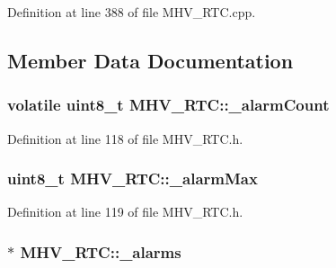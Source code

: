 \-Definition at line 388 of file \-M\-H\-V\-\_\-\-R\-T\-C.\-cpp.



\subsection{\-Member \-Data \-Documentation}
\hypertarget{class_m_h_v___r_t_c_a953a79952c9fa5fde5d1dacbc03d3b46}{
\subsubsection[{\-\_\-alarm\-Count}]{\setlength{\rightskip}{0pt plus 5cm}volatile uint8\-\_\-t {\bf \-M\-H\-V\-\_\-\-R\-T\-C\-::\-\_\-alarm\-Count}}}
\label{class_m_h_v___r_t_c_a953a79952c9fa5fde5d1dacbc03d3b46}


\-Definition at line 118 of file \-M\-H\-V\-\_\-\-R\-T\-C.\-h.

\hypertarget{class_m_h_v___r_t_c_aed7d37466a99362b78dd9ccf1390d35c}{
\subsubsection[{\-\_\-alarm\-Max}]{\setlength{\rightskip}{0pt plus 5cm}uint8\-\_\-t {\bf \-M\-H\-V\-\_\-\-R\-T\-C\-::\-\_\-alarm\-Max}}}
\label{class_m_h_v___r_t_c_aed7d37466a99362b78dd9ccf1390d35c}


\-Definition at line 119 of file \-M\-H\-V\-\_\-\-R\-T\-C.\-h.

\hypertarget{class_m_h_v___r_t_c_afaaed6deea21b52f8bde5f8ebc0abf70}{
\subsubsection[{\-\_\-alarms}]{$\ast$ {\bf \-M\-H\-V\-\_\-\-R\-T\-C\-::\-\_\-alarms}}}
\label{class_m_h_v___r_t_c_afaaed6deea21b52f8bde5f8ebc0abf70}


